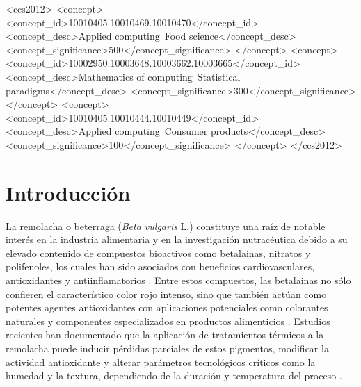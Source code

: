\documentclass[manuscript,screen,review]{acmart}
\begin{document}
\begin{CCSXML}
<ccs2012>
 <concept>
  <concept_id>10010405.10010469.10010470</concept_id>
  <concept_desc>Applied computing~Food science</concept_desc>
  <concept_significance>500</concept_significance>
 </concept>
 <concept>
  <concept_id>10002950.10003648.10003662.10003665</concept_id>
  <concept_desc>Mathematics of computing~Statistical paradigms</concept_desc>
  <concept_significance>300</concept_significance>
 </concept>
 <concept>
  <concept_id>10010405.10010444.10010449</concept_id>
  <concept_desc>Applied computing~Consumer products</concept_desc>
  <concept_significance>100</concept_significance>
 </concept>
</ccs2012>
\end{CCSXML}
\received[revised]{}
\received[accepted]{}
\maketitle
\section{Introducción}
La remolacha o beterraga (\textit{Beta vulgaris} L.) constituye una raíz de notable interés en la industria alimentaria y en la investigación nutracéutica debido a su elevado contenido de compuestos bioactivos como betalainas, nitratos y polifenoles, los cuales han sido asociados con beneficios cardiovasculares, antioxidantes y antiinflamatorios \cite{Clifford2021,Siervo2016,WoottonBeard2011}. Entre estos compuestos, las betalainas no sólo confieren el característico color rojo intenso, sino que también actúan como potentes agentes antioxidantes con aplicaciones potenciales como colorantes naturales y componentes especializados en productos alimenticios \cite{Neelwarne2013,Montoya2011}. Estudios recientes han documentado que la aplicación de tratamientos térmicos a la remolacha puede inducir pérdidas parciales de estos pigmentos, modificar la actividad antioxidante y alterar parámetros tecnológicos críticos como la humedad y la textura, dependiendo de la duración y temperatura del proceso \cite{ArrudaRamos2017,Montoya2011}.
\end{document}
